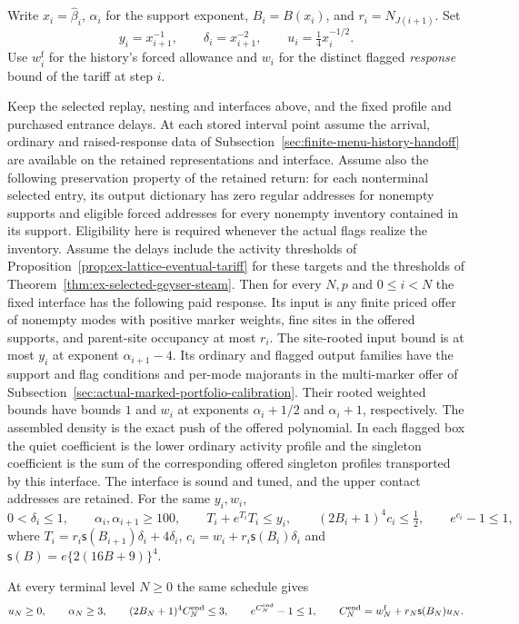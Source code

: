 Write $x_i=\widehat\beta_i$, $\alpha_i$ for the support exponent,
$B_i=B(x_i)$, and $r_i=N_{J(i+1)}$. Set
\[
 y_i=x_{i+1}^{-1},\qquad \delta_i=x_{i+1}^{-2},
 \qquad u_i=\tfrac14 x_i^{-1/2}.
\]
Use $w_i^{\mathrm f}$ for the history's forced allowance and $w_i$ for
the distinct flagged \emph{response} bound of the tariff at step $i$.

\begin{proposition}
\label{prop:selected-centered-retention}
Keep the selected replay, nesting and interfaces above, and the fixed
profile and purchased entrance delays. At each stored interval point
assume the arrival, ordinary and raised-response
data of Subsection~\ref{sec:finite-menu-history-handoff}
are available on the retained representations and interface. Assume also
the following preservation property of the retained return: for each
nonterminal selected entry, its output dictionary has zero regular
addresses for nonempty supports and eligible forced addresses for
every nonempty inventory contained in its support. Eligibility here
is required whenever the actual flags realize the inventory. Assume the delays include the activity thresholds of
Proposition~\ref{prop:ex-lattice-eventual-tariff} for these targets and
the thresholds of Theorem~\ref{thm:ex-selected-geyser-steam}.
Then for every $N,p$ and $0\le i<N$ the fixed interface has the following
paid response. Its input is any finite priced offer of nonempty modes
with positive marker weights, fine sites in the offered supports, and
parent-site occupancy at most $r_i$. The site-rooted input bound is at
most $y_i$ at exponent $\alpha_{i+1}-4$. Its ordinary and flagged
output families have the support and flag conditions and per-mode
majorants in the multi-marker offer of
Subsection~\ref{sec:actual-marked-portfolio-calibration}.
Their rooted weighted bounds have bounds $1$ and $w_i$ at exponents
$\alpha_i+1/2$ and $\alpha_i+1$, respectively. The assembled density is
the exact push of the offered polynomial. In each flagged box the
quiet coefficient is the lower ordinary activity profile and the
singleton coefficient is the sum of the corresponding offered
singleton profiles transported by this interface. The interface is sound and
tuned, and the upper contact addresses are retained. For the same $y_i,w_i$,
\[
 0<\delta_i\le1,\qquad \alpha_i,\alpha_{i+1}\ge100,\qquad
 T_i+e^{T_i}T_i\le y_i,\qquad
 (2B_i+1)^4c_i\le\tfrac12,\qquad e^{c_i}-1\le1,
\]
where $T_i=r_i\mathsf s(B_{i+1})\delta_i+4\delta_i$,
$c_i=w_i+r_i\mathsf s(B_i)\delta_i$ and
$\mathsf s(B)=e\{2(16B+9)\}^4$.

At every terminal level $N\ge0$ the same schedule gives
\[
 u_N\ge0,\qquad \alpha_N\ge3,\qquad
 (2B_N+1)^4 C_N^{\rm end}\le3,\qquad e^{C_N^{\rm end}}-1\le1,
 \qquad
 C_N^{\rm end}=w_N^{\mathrm f}+r_N\mathsf s(B_N)u_N.
\]
\end{proposition}

